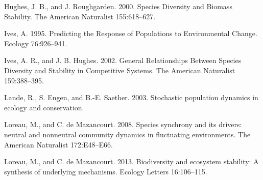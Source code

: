 \documentclass[12pt,]{article}
\begin{document}
Hughes, J. B., and J. Roughgarden. 2000. Species Diversity and Biomass
Stability. The American Naturalist 155:618--627.

Ives, A. 1995. Predicting the Response of Populations to Environmental
Change. Ecology 76:926--941.

Ives, A. R., and J. B. Hughes. 2002. General Relationships Between
Species Diversity and Stability in Competitive Systems. The American
Naturalist 159:388--395.

Lande, R., S. Engen, and B.-E. Saether. 2003. Stochastic population
dynamics in ecology and conservation.

Loreau, M., and C. {{de Mazancourt}}. 2008. Species synchrony and its
drivers: neutral and nonneutral community dynamics in fluctuating
environments. The American Naturalist 172:E48--E66.

Loreau, M., and C. {{de Mazancourt}}. 2013. Biodiversity and ecosystem
stability: A synthesis of underlying mechanisms. Ecology Letters
16:106--115.
\end{document}
